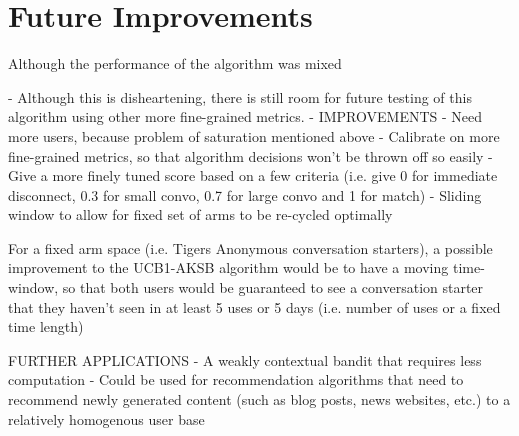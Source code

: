\section{Future Improvements}

Although the performance of the algorithm was mixed 

- Although this is disheartening, there is still room for future testing of this algorithm using other more fine-grained metrics.
- IMPROVEMENTS
	- Need more users, because problem of saturation mentioned above
	- Calibrate on more fine-grained metrics, so that algorithm decisions won't be thrown off so easily
      - Give a more finely tuned score based on a few criteria (i.e. give 0 for immediate disconnect, 0.3 for small convo, 0.7 for large convo and 1 for match)
	- Sliding window to allow for fixed set of arms to be re-cycled optimally


For a fixed arm space (i.e. Tigers Anonymous conversation starters), a possible improvement to the UCB1-AKSB algorithm would be to have a moving time-window, so that both users would be guaranteed to see a conversation starter that they haven't seen in at least 5 uses or 5 days (i.e. number of uses or a fixed time length)

FURTHER APPLICATIONS
- A weakly contextual bandit that requires less computation
- Could be used for recommendation algorithms that need to recommend newly generated content (such as blog posts, news websites, etc.) to a relatively homogenous user base
